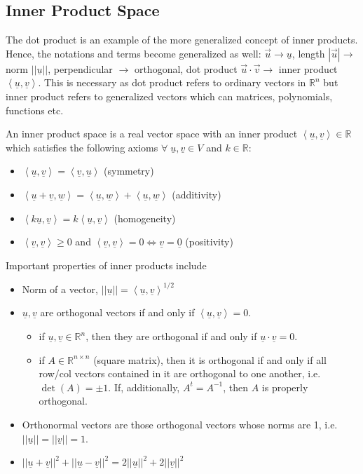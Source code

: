 \documentclass{article}
\begin{document}
\subsection{Inner Product Space}

The dot product is an example of the more generalized concept of inner products. Hence, the notations and terms become generalized as well: $\vec{u} \rightarrow \underline{u}$, length $|\vec{u}| \rightarrow$ norm $||\underline{u}||$, perpendicular $\rightarrow$ orthogonal, dot product $\vec{u} \cdot \vec{v} \rightarrow$ inner product $\left<\underline{u}, \underline{v}\right>$. This is necessary as dot product refers to ordinary vectors in $\mathbb{R}^n$ but inner product refers to generalized vectors which can matrices, polynomials, functions etc.

An inner product space is a real vector space with an inner product $\left<\underline{u}, \underline{v}\right> \in \mathbb{R}$ which satisfies the following axioms $\forall \; \underline{u}, \underline{v} \in V$ and $k \in \mathbb{R}$:
\begin{itemize}
	\item $\left<\underline{u}, \underline{v}\right> = \left<\underline{v}, \underline{u}\right>$ (symmetry)
	\item $\left<\underline{u} + \underline{v}, \underline{w}\right> = \left<\underline{u}, \underline{w}\right> + \left<\underline{u}, \underline{w}\right>$ (additivity)
	\item $\left<k\underline{u}, \underline{v}\right> = k\left<\underline{u}, \underline{v}\right>$ (homogeneity)
	\item $\left<\underline{v}, \underline{v}\right> \geq 0$ and $\left<\underline{v}, \underline{v}\right> = 0 \iff \underline{v} = \underline{0}$ (positivity)
\end{itemize}

Important properties of inner products include
\begin{itemize}
	\item Norm of a vector, $||\underline{u}|| = \left<\underline{u}, \underline{v}\right>^{1/2}$
	\item $\underline{u}, \underline{v}$ are orthogonal vectors if and only if $\left<\underline{u}, \underline{v}\right> = 0$. 
	\begin{itemize}
		\item if $\underline{u}, \underline{v} \in \mathbb{R}^n$, then they are orthogonal if and only if $\underline{u} \cdot \underline{v} = 0$.
		\item if $A \in \mathbb{R}^{n\times n}$ (square matrix),  then it is orthogonal if and only if all row/col vectors contained in it are orthogonal to one another, i.e. $\det(A) = \pm 1$. If, additionally, $A^t = A^{-1}$, then $A$ is properly orthogonal.
	\end{itemize}
	\item Orthonormal vectors are those orthogonal vectors whose norms are 1, i.e. $||\underline{u}|| = ||\underline{v}|| = 1$.
	\item $||\underline{u} + \underline{v}||^2 +||\underline{u} - \underline{v}||^2 = 2||\underline{u}||^2 + 2||\underline{v}||^2$
\end{itemize}
\end{document}
